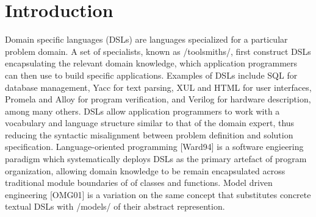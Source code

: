 
\section{Introduction}

Domain specific languages (DSLs) are languages specialized for a particular problem domain. A set of specialists, known as /toolsmiths/, first construct DSLs encapsulating the relevant domain knowledge, which application programmers can then use to build specific applications. Examples of DSLs include SQL for database management, Yacc for text parsing, XUL and HTML for user interfaces, Promela and Alloy for program verification, and Verilog for hardware description, among many others. DSLs allow application programmers to work with a vocabulary and language structure similar to that of the domain expert, thus reducing the syntactic misalignment between problem definition and solution specification. Language-oriented programming [Ward94] is a software engieering paradigm which systematically deploys DSLs as the primary artefact of program organization, allowing domain knowledge to be remain encapsulated across traditional module boundaries of of classes and functions. Model driven engineering [OMG01] is a variation on the same concept that substitutes concrete textual DSLs with /models/ of their abstract represention.

